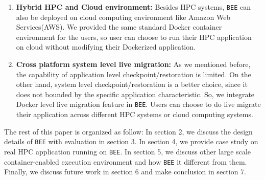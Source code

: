 \begin{enumerate}
\item \textbf{Hybrid HPC and Cloud environment:}
Besides HPC systems, \texttt{BEE} can also be deployed on cloud computing environment like Amazon Web Services(AWS). We provided the same standard Docker container environment for the users, so user can choose to run their HPC application on cloud without modifying their Dockerized application. 

\item \textbf{Cross platform system level live migration:}
As we mentioned before, the capability of application level checkpoint/restoration is limited. On the other hand, system level checkpoint/restoration is a better choice, since it does not bounded by the specific application characteristic. So, we integrate Docker level live migration feature in \texttt{BEE}. Users can choose to do live migrate their application across different HPC systems or cloud computing systems.

\end{enumerate}

The rest of this paper is organized as follow: In section 2, we discuss the design details of \texttt{BEE} with evaluation in section 3. In section 4, we provide case study on real HPC application running on \texttt{BEE}. In section 5, we discuss other large scale container-enabled execution environment and how \texttt{BEE} it different from them. Finally, we discuss future work in section 6 and make conclusion in section 7.





